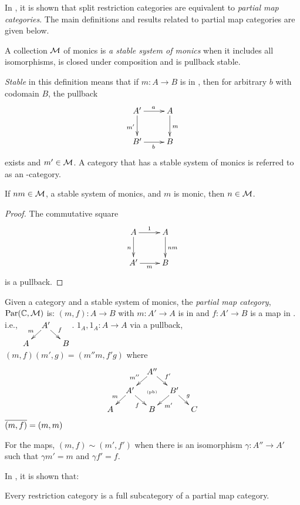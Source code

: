 In \cite{cockett2002:restcategories1}, it is shown that
 split restriction categories are equivalent to
\emph{partial map categories}. The main
definitions and results related to partial map categories are given below.

\begin{definition}
A collection $\mathcal{M}$ of monics is \emph{a stable system of monics}
when it includes all isomorphisms, is closed under composition and is
pullback stable.
\end{definition}

\emph{Stable} in this definition means that if $m:A\to B$ is in
\Mstab, then for arbitrary $b$ with codomain $B$, the
pullback
\[\xymatrix{
A'\ar[r]^a \ar[d]_{m'} &A\ar[d]^{m}\\
B' \ar[r]_{b} & B}
\]
exists and $m' \in \mathcal{M}$. A category that has a stable system of monics
is referred to as an \Mstab-category.

\begin{lemma}
If $nm \in \mathcal{M}$, a stable system of monics, and $m$ is monic, then $n \in
\mathcal{M}$.
\end{lemma}
\begin{proof}
The commutative square
\[\xymatrix{
A\ar[d]_n \ar[r]^{1} &A\ar[d]^{nm}\\
A' \ar[r]_{m} & B}
\] is a pullback.
\end{proof}

Given a category \C and a stable system of monics, the
 \emph{partial map category}, $\text{Par}(\mathbb{C},\mathcal{M})$ is:
{$(m,f):A\to B$  with $m:A' \to A$ is
 in \Mstab and $f:A' \to B$ is a map in \C. i.e.,
$\xymatrix @R-15pt @C-15pt{&A'\ar[dl]_{m} \ar[dr]^{f}\\A&&B}$.}
{$1_A,1_A:A \to A$}
{via a pullback, $(m,f)(m',g) = (m'' m, f' g)$ where
 \[\xymatrix @C-15pt @R-15pt{&&A''\ar[dl]_{m''}\ar[dr]^{f'}\\
 &A'\ar[dl]_{m}\ar[dr]_{f}&\text{{\tiny (pb)}}&B'\ar[dl]^{m'}\ar[dr]^{g}\\
A&&B&&C}\]}
{$\overline{(m,f)} = (m,m)$}

For the maps, $(m,f) \sim (m',f')$ when there is an isomorphism $\gamma : A'' \to A'$ such that $\gamma m' = m$
and $\gamma f' = f$.

In \cite{cockettlack2003:restcategories2}, it is shown that:
\begin{theorem}
Every restriction category is a full subcategory of a partial map category.
\end{theorem}
